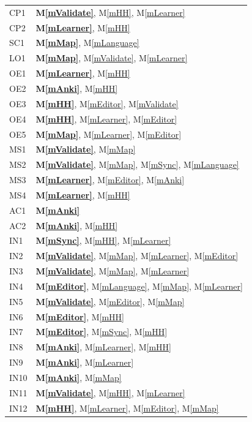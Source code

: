\documentclass[12pt, titlepage]{article}
\newcommand{\mref}[1]{M\ref{#1}}
\begin{document}
\begin{longtable}{@{}p{}p{}@{}}
CP1 & \textbf{\mref{mValidate}}, \mref{mHH}, \mref{mLearner}\\
CP2 & \textbf{\mref{mLearner}}, \mref{mHH}\\
SC1 & \textbf{\mref{mMap}}, \mref{mLanguage}\\
LO1 & \textbf{\mref{mMap}}, \mref{mValidate}, \mref{mLearner}\\
OE1 & \textbf{\mref{mLearner}}, \mref{mHH}\\
OE2 & \textbf{\mref{mAnki}}, \mref{mHH}\\
OE3 & \textbf{\mref{mHH}}, \mref{mEditor}, \mref{mValidate}\\
OE4 & \textbf{\mref{mHH}}, \mref{mLearner}, \mref{mEditor}\\
OE5 & \textbf{\mref{mMap}}, \mref{mLearner}, \mref{mEditor}\\
MS1 & \textbf{\mref{mValidate}}, \mref{mMap}\\
MS2 & \textbf{\mref{mValidate}}, \mref{mMap}, \mref{mSync}, \mref{mLanguage}\\
MS3 & \textbf{\mref{mLearner}}, \mref{mEditor}, \mref{mAnki}\\
MS4 & \textbf{\mref{mLearner}}, \mref{mHH}\\
AC1 & \textbf{\mref{mAnki}}\\
AC2 & \textbf{\mref{mAnki}}, \mref{mHH}\\
IN1 & \textbf{\mref{mSync}}, \mref{mHH}, \mref{mLearner}\\
IN2 & \textbf{\mref{mValidate}}, \mref{mMap}, \mref{mLearner}, \mref{mEditor}\\
IN3 & \textbf{\mref{mValidate}}, \mref{mMap}, \mref{mLearner}\\
IN4 & \textbf{\mref{mEditor}}, \mref{mLanguage}, \mref{mMap}, \mref{mLearner}\\
IN5 & \textbf{\mref{mValidate}}, \mref{mEditor}, \mref{mMap}\\
IN6 & \textbf{\mref{mEditor}}, \mref{mHH}\\
IN7 & \textbf{\mref{mEditor}}, \mref{mSync}, \mref{mHH}\\
IN8 & \textbf{\mref{mAnki}}, \mref{mLearner}, \mref{mHH}\\
IN9 & \textbf{\mref{mAnki}}, \mref{mLearner}\\
IN10 & \textbf{\mref{mAnki}}, \mref{mMap}\\
IN11 & \textbf{\mref{mValidate}}, \mref{mHH}, \mref{mLearner}\\
IN12 & \textbf{\mref{mHH}}, \mref{mLearner}, \mref{mEditor}, \mref{mMap}\\

\end{longtable}
\end{document}
